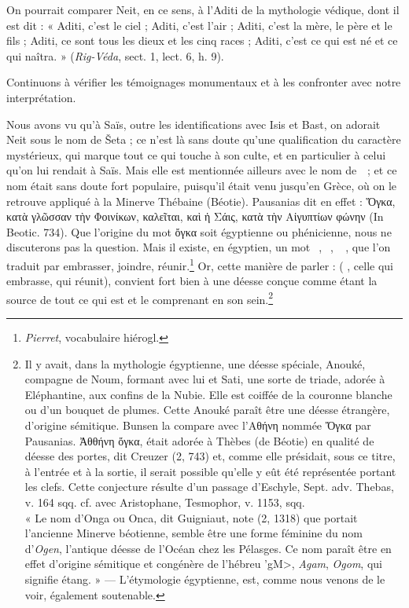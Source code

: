 \documentclass[a4paper, 11pt, oneside]{article}
\newcommand*\hieroAAAH{}
\newcommand*\hieroABFY{\raisebox{0.3ex}{}}
\newcommand*\hieroABFZ{}
\newcommand*\hieroABGA{}
\newcommand*\hieroABGB{}
\newcommand*\hieroABGC{}
\newcommand*\hieroABGD{\raisebox{0.3ex}{}}
\newcommand*\hieroABGE{}
\begin{document}
On pourrait comparer Neit, en ce sens, à l'Aditi de la mythologie védique, dont il est dit : « Aditi, c'est le ciel ; Aditi, c'est l'air ; Aditi, c'est la mère, le père et le fils ; Aditi, ce sont tous les dieux et les cinq races ; Aditi, c'est ce qui est né et ce qui naîtra. » (\emph{Rig-Véda}, sect. 1, lect. 6, h. 9).

Continuons à vérifier les témoignages monumentaux et à les confronter avec notre interprétation.

Nous avons vu qu'à Saïs, outre les identifications avec Isis et Bast, on adorait Neit sous le nom de Šeta ; ce n'est là sans doute qu'une qualification du caractère mystérieux, qui marque tout ce qui touche à son culte, et en particulier à celui qu'on lui rendait à Saïs. Mais elle est mentionnée ailleurs avec le nom de $\hieroAAAH\:\hieroABFY$ ; et ce nom était sans doute fort populaire, puisqu'il était venu jusqu'en Grèce, où on le retrouve appliqué à la Minerve Thébaine (Béotie). Pausanias dit en effet : Ὅγκα, κατὰ γλῶσσαν τὴν Φοινίκων, καλεῖται, καὶ ἡ Σάις, κατὰ τὴν Αἰγυπτίων φώνην (In Beotic. 734). Que l'origine du mot ὄγκα soit égyptienne ou phénicienne, nous ne discuterons pas la question. Mais il existe, en égyptien, un mot $\hieroAAAH\:\hieroABFZ\:\hieroABGA$, $\hieroAAAH\:\hieroABGB\:\hieroABGC$, $\hieroAAAH\:\hieroABGD\allowbreak\:\hieroABGE\:\hieroABGA$, que l'on traduit par embrasser, joindre, réunir.\footnote{\emph{Pierret}, vocabulaire hiérogl.} Or, cette manière de parler : ($\hieroAAAH\:\hieroABFY$, celle qui embrasse, qui réunit), convient fort bien à une déesse conçue comme étant la source de tout ce qui est et le comprenant en son sein.\footnote{Il y avait, dans la mythologie égyptienne, une déesse spéciale, Anouké, compagne de Noum, formant avec lui et Sati, une sorte de triade, adorée à Eléphantine, aux confins de la Nubie. Elle est coiffée de la couronne blanche ou d'un bouquet de plumes. Cette Anouké paraît être une déesse étrangère, d'origine sémitique. Bunsen la compare avec l'Αθήνη nommée Ὄγκα par Pausanias. Ἀθθήνη ὄγκα, était adorée à Thèbes (de Béotie) en qualité de déesse des portes, dit Creuzer (2, 743) et, comme elle présidait, sous ce titre, à l'entrée et à la sortie, il serait possible qu'elle y eût été représentée portant les clefs. Cette conjecture résulte d'un passage d'Eschyle, Sept. adv. Thebas, v. 164 sqq. cf. avec Aristophane, Tesmophor, v. 1153, sqq.\\\hspace*{5mm}« Le nom d'Onga ou Onca, dit Guigniaut, note (2, 1318) que portait l'ancienne Minerve béotienne, semble être une forme féminine du nom d'\emph{Ogen}, l'antique déesse de l'Océan chez les Pélasges. Ce nom paraît être en effet d'origine sémitique et congénère de l'hébreu \foreignlanguage{hebrew}{\<'gM>}, \emph{Agam}, \emph{Ogom}, qui signifie étang. » --- L'étymologie égyptienne, est, comme nous venons de le voir, également soutenable.}
\end{document}
